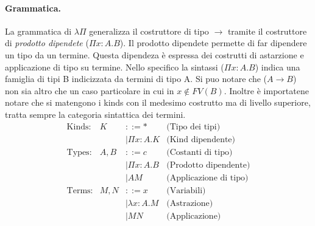 \paragraph{Grammatica.}
La grammatica di $\lambda \Pi$ generalizza il costruttore di tipo $\to$ tramite il costruttore di \emph{prodotto dipendete} ($\Pi x : A.B$). Il prodotto dipendete permette di far dipendere un tipo
da un termine. Questa dipendeza è espressa dei costrutti di astarzione e applicazione di tipo su termine. Nello specifico la sintassi ($\Pi x : A.B$) indica una famiglia di tipi B indicizzata da
termini di tipo A. Si puo notare che ($A \to B$) non sia altro che un caso particolare in cui in $x \notin FV(B)$. Inoltre è importatene notare che si matengono i kinds con il medesimo costrutto
ma di livello superiore, tratta sempre la categoria sintattica dei termini.
\begin{equation}
    \begin{array}{lrll}
        \text{Kinds:}   & K           & ::= \ast                & \text{(Tipo dei tipi)}        \\
                        &             & \mid \Pi x : A. K       & \text{(Kind dipendente)}      \\
        \text{Types:}   & A, B        & ::= c                   & \text{(Costanti di tipo)}     \\
                        &             & \mid \Pi x : A. B       & \text{(Prodotto dipendente)}  \\
                        &             & \mid A M                & \text{(Applicazione di tipo)} \\
        \text{Terms:}   & M, N        & ::= x                   & \text{(Variabili)}            \\
                        &             & \mid \lambda x : A. M   & \text{(Astrazione)}           \\
                        &             & \mid M N                & \text{(Applicazione)}
    \end{array}
    \tag{$\lambda \Pi$}
    \label{eq:grammar_system_p}
\end{equation}

